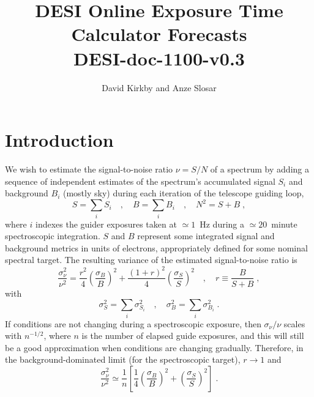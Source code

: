 \documentclass[11pt]{article}
\title{DESI Online Exposure Time Calculator Forecasts\\
{\Large DESI-doc-1100-v0.3}}
\author{David Kirkby and Anze Slosar}
\begin{document}
\maketitle

\section{Introduction}

We wish to estimate the signal-to-noise ratio $\nu = S/N$ of a spectrum by adding a sequence of independent estimates of the spectrum's accumulated signal $S_i$ and background $B_i$ (mostly sky) during each iteration of the telescope guiding loop,
\begin{equation}
S = \sum_i S_i \quad, \quad B = \sum_i B_i \quad , \quad N^2 = S + B \; ,
\end{equation}
where $i$ indexes the guider exposures taken at $\simeq 1$~Hz during a $\simeq 20$~minute spectroscopic integration. $S$ and $B$ represent some integrated signal and background metrics in units of electrons, appropriately defined for some nominal spectral target. The resulting variance of the estimated signal-to-noise ratio is
\begin{equation}
\frac{\sigma_\nu^2}{\nu^2} = \frac{r^2}{4} \left(\frac{\sigma_B}{B}\right)^2 + \frac{(1+r)^2}{4} \left(\frac{\sigma_S}{S}\right)^2
\quad , \quad r \equiv \frac{B}{S+B}
\label{eqn:dnu}
\; ,
\end{equation}
with
\begin{equation}
\sigma_{S}^2 = \sum_i \sigma_{S_i}^2 \quad , \quad \sigma_{B}^2 = \sum_i \sigma_{B_i}^2 \; .
\end{equation}
If conditions are not changing during a spectroscopic exposure, then $\sigma_{\nu}/\nu$ scales with $n^{-1/2}$, where $n$ is the number of elapsed guide exposures, and this will still be a good approximation when conditions are changing gradually. Therefore, in the background-dominated limit (for the spectroscopic target), $r \rightarrow 1$ and
\begin{equation}
\frac{\sigma_\nu^2}{\nu^2} \simeq \frac{1}{n}\left[
\frac{1}{4} \left(\frac{\sigma_B}{B}\right)^2 + \left(\frac{\sigma_S}{S}\right)^2\right] \; .
\label{eqn:snr-bglim}
\end{equation}
\end{document}
